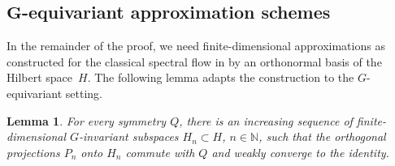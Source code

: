 \documentclass[pdftex]{sigma}
\numberwithin{equation}{section}
\newtheorem{Lemma}[Theorem]{Lemma}
\theoremstyle{definition}
\begin{document}
\subsection{\texorpdfstring{$\boldsymbol{G}$}{G}-equivariant approximation schemes}
In the remainder of the proof, we need finite-dimensional approximations as constructed for the classical spectral flow in \cite{JacoboUniqueness} by an orthonormal basis of the Hilbert space~$H$. The following lemma adapts the construction to the $G$-equivariant setting.

\begin{Lemma}\label{lem-Zorn}
For every symmetry $Q$, there is an increasing sequence of finite-dimensional $G$\nobreakdash-in\-vari\-ant subspaces $H_n\subset H$, $n\in\mathbb{N}$, such that the orthogonal projections $P_n$ onto $H_n$ commute with $Q$ and weakly converge to the identity.
\end{Lemma}
\end{document}
